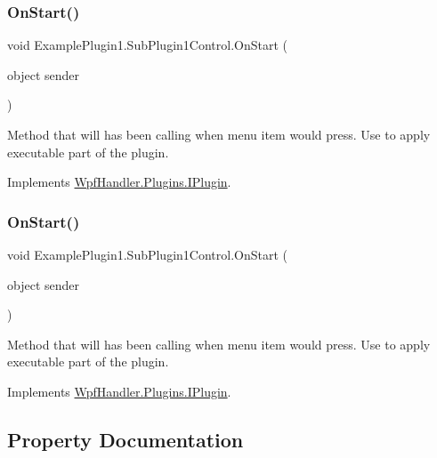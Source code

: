 \subsubsection{\texorpdfstring{On\+Start()}{OnStart()}\hspace{0.1cm}{\footnotesize\ttfamily [1/2]}}
{\footnotesize\ttfamily void Example\+Plugin1.\+Sub\+Plugin1\+Control.\+On\+Start (\begin{DoxyParamCaption}\item[{object}]{sender }\end{DoxyParamCaption})}



Method that will has been calling when menu item would press. Use to apply executable part of the plugin. 



Implements \mbox{\hyperlink{interface_wpf_handler_1_1_plugins_1_1_i_plugin_aabe1a8e5680ebeb37f96ffe86b6123e9}{Wpf\+Handler.\+Plugins.\+I\+Plugin}}.

\mbox{\label{class_example_plugin1_1_1_sub_plugin1_control_aec384d5e0b746afd89495530eb2a679e}} 
\subsubsection{\texorpdfstring{On\+Start()}{OnStart()}\hspace{0.1cm}{\footnotesize\ttfamily [2/2]}}
{\footnotesize\ttfamily void Example\+Plugin1.\+Sub\+Plugin1\+Control.\+On\+Start (\begin{DoxyParamCaption}\item[{object}]{sender }\end{DoxyParamCaption})}



Method that will has been calling when menu item would press. Use to apply executable part of the plugin. 



Implements \mbox{\hyperlink{interface_wpf_handler_1_1_plugins_1_1_i_plugin_aabe1a8e5680ebeb37f96ffe86b6123e9}{Wpf\+Handler.\+Plugins.\+I\+Plugin}}.



\subsection{Property Documentation}
\mbox{\label{class_example_plugin1_1_1_sub_plugin1_control_a8bbc25adfcf05fde08f1c3ae882f7007}} 
